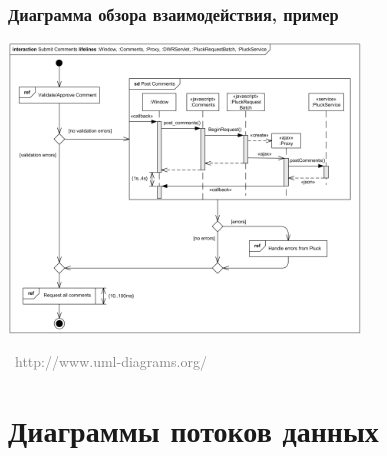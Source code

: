 \documentclass[xetex,mathserif,serif]{beamer}
\newcommand{\attribution}[1] {
	\vspace{-5mm}\begin{flushright}\begin{scriptsize}\textcolor{gray}{\textcopyright\, #1}\end{scriptsize}\end{flushright}
}
\begin{document}
	\begin{frame}
		\frametitle{Диаграмма обзора взаимодействия, пример}
		\begin{center}
			\includegraphics[width=0.7\textwidth]{interactionOverviewExample.png}
			\attribution{http://www.uml-diagrams.org/}
		\end{center}
	\end{frame}

	\section{Диаграммы потоков данных}
\end{document}
